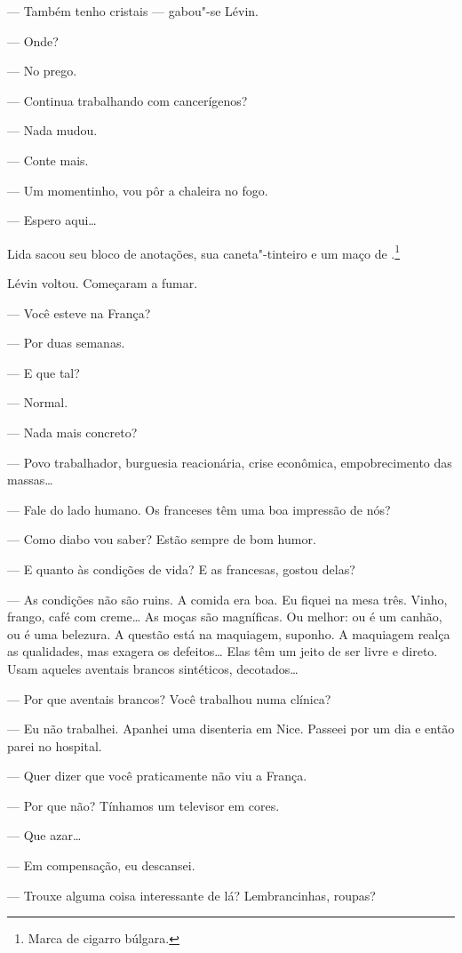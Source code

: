 --- Também tenho cristais --- gabou"-se Lévin.

--- Onde?

--- No prego.

--- Continua trabalhando com cancerígenos?

--- Nada mudou.

--- Conte mais.

--- Um momentinho, vou pôr a chaleira no fogo.

--- Espero aqui\ldots{}

Lida sacou seu bloco de anotações, sua caneta"-tinteiro e um maço de
.\footnote{Marca de cigarro búlgara.}

Lévin voltou. Começaram a fumar.

--- Você esteve na França?

--- Por duas semanas.

--- E que tal?

--- Normal.

--- Nada mais concreto?

--- Povo trabalhador, burguesia reacionária, crise econômica,
empobrecimento das massas\ldots{}

--- Fale do lado humano. Os franceses têm uma boa impressão de nós?

--- Como diabo vou saber? Estão sempre de bom humor.

--- E quanto às condições de vida? E as francesas, gostou delas?

--- As condições não são ruins. A comida era boa. Eu fiquei na mesa
três. Vinho, frango, café com creme\ldots{} As moças são magníficas. Ou
melhor: ou é um canhão, ou é uma belezura. A questão está na maquiagem,
suponho. A maquiagem realça as qualidades, mas exagera os defeitos\ldots{}
Elas têm um jeito de ser livre e direto. Usam aqueles aventais brancos
sintéticos, decotados\ldots{}

--- Por que aventais brancos? Você trabalhou numa clínica?

--- Eu não trabalhei. Apanhei uma disenteria em Nice. Passeei por um dia
e então parei no hospital.

--- Quer dizer que você praticamente não viu a França.

--- Por que não? Tínhamos um televisor em cores.

--- Que azar\ldots{}

--- Em compensação, eu descansei.

--- Trouxe alguma coisa interessante de lá? Lembrancinhas, roupas?

